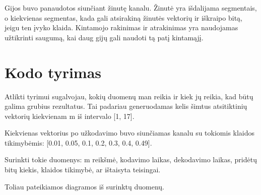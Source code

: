 \documentclass{article}
\begin{document}
Gijos buvo panaudotos siunčiant žinutę kanalu. Žinutė yra išdalijama segmentais, o kiekvienas segmentas, kada gali atsirakiną žinutės vektorių ir iškraipo bitą, jeigu ten įvyko klaida. Kintamojo rakinimas ir atrakinimas yra naudojamas užtikrinti saugumą, kai daug gijų gali naudoti tą patį kintamąjį.

\section{Kodo tyrimas}
Atlikti tyrimui sugalvojau, kokių duomenų man reikia ir kiek jų reikia, kad būtų galima grubius rezultatus. Tai padariau generuodamas kelis šimtus atsitiktinių vektorių kiekvienam m iš intervalo [1, 17].

Kiekvienas vektorius po užkodavimo buvo siunčiamas kanalu su tokiomis klaidos tikimybėmis: [0.01, 0.05, 0.1, 0.2, 0.3, 0.4, 0.49]. 

Surinkti tokie duomenys: m reikšmė, kodavimo laikas, dekodavimo laikas, pridėtų bitų kiekis, klaidos tikimybė, ar ištaisyta teisingai.

Toliau pateikiamos diagramos iš surinktų duomenų.
\end{document}

